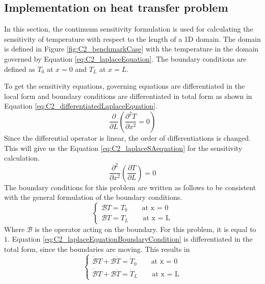 \subsection{Implementation on heat transfer problem}
In this section, the continuum sensitivity formulation is used for calculating the sensitivity of temperature with respect to the length of a 1D domain. The domain is defined in Figure \ref{fig:C2_benchmarkCase} with the temperature in the domain governed by Equation \eqref{eq:C2_laplaceEquation}. The boundary conditions are defined as $T_0$ at $x=0$ and $T_L$ at $x=L$.

To get the sensitivity equations, governing equations are differentiated in the local form and boundary conditions are differentiated in total form as shown in Equation \eqref{eq:C2_differentiatedLaplaceEquation}.
%
\begin{equation}\label{eq:C2_differentiatedLaplaceEquation}
    \frac{\partial}{\partial L}
    \left( \frac{\partial^2 T}{\partial x^2} = 0 \right)
\end{equation}
%
Since the differential operator is linear, the order of differentiations is changed. This will give us the Equation \eqref{eq:C2_laplaceSAequation} for the sensitivity calculation.
%
\begin{equation}\label{eq:C2_laplaceSAequation}
    \frac{\partial^2}{\partial x^2} \left( \frac{\partial T}{\partial L} \right) = 0
\end{equation}
%
The boundary conditions for this problem are written as follows to be consistent with the general formulation of the boundary conditions. 
%
\begin{equation}\label{eq:C2_laplaceEquationBoundaryCondition}
\begin{cases}
    \mathcal{B}T = T_0 \qquad \text{at x = 0} \\
    \mathcal{B}T = T_L \qquad \text{at x = L}
\end{cases}
\end{equation}
%
Where $\mathcal{B}$ is the operator acting on the boundary. For this problem, it is equal to $1$. Equation \eqref{eq:C2_laplaceEquationBoundaryCondition} is differentiated in the total form, since the boundaries are moving. This results in
%
\begin{equation}
\begin{cases}
    \dot{\mathcal{B}} T + \mathcal{B} \dot{T} = \dot{T}_0 \qquad \text{at x = 0} \\
    \dot{\mathcal{B}} T + \mathcal{B} \dot{T} = \dot{T}_L \qquad \text{at x = L}
\end{cases}
\end{equation}
